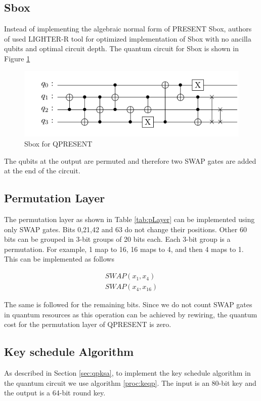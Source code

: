 \documentclass[preprint]{transcrypto}
\begin{document}
\subsection{Sbox}
Instead of implementing the algebraic normal form of PRESENT Sbox, authors of \cite{gop} used LIGHTER-R tool \cite{LighterR} for optimized implementation of Sbox with no ancilla qubits and optimal circuit depth. The quantum circuit for Sbox is shown in Figure \ref{fig:qpsbox}

\begin{figure}[h!]
    \centering
    \includegraphics[width=\linewidth]{present/sbox.pdf}
    \caption{Sbox for QPRESENT}
    \label{fig:qpsbox}
\end{figure}

The qubits at the output are permuted and therefore two SWAP gates are added at the end of the circuit.

\subsection{Permutation Layer}
The permutation layer as shown in Table \ref{tab:pLayer} can be implemented using only SWAP gates. Bits 0,21,42 and 63 do not change their positions. Other 60 bits can be grouped in 3-bit groups of 20 bits each. Each 3-bit group is a permutation. For example, 1 map to 16, 16 maps to 4, and then 4 maps to 1. This can be implemented as follows 

\begin{equation*}
    \begin{aligned}
        SWAP(x_1, x_4) \\
        SWAP(x_4,x_{16})
    \end{aligned}
\end{equation*}

The same is followed for the remaining bits. Since we do not count SWAP gates in quantum resources as this operation can be achieved by rewiring, the quantum cost for the permutation layer of QPRESENT is zero.

\subsection{Key schedule Algorithm}
As described in Section \ref{sec:qpksa}, to implement the key schedule algorithm in the quantum circuit we use algorithm \ref{proc:keqp}. The input is an 80-bit key and the output is a 64-bit round key.
\end{document}
